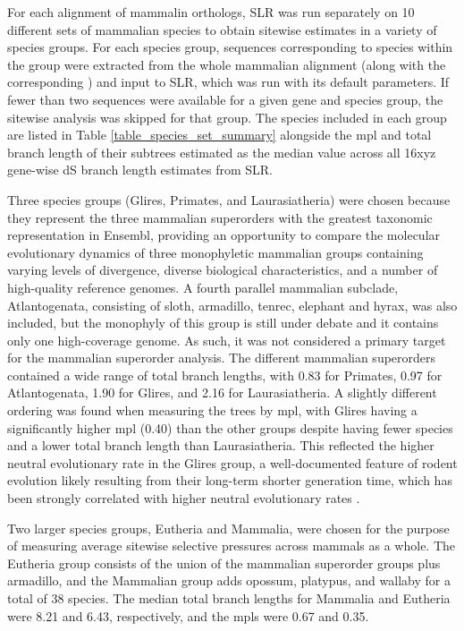 For each alignment of mammalin orthologs, SLR was run separately on 10
different sets of mammalian species to obtain sitewise estimates in a
variety of species groups. For each species group, sequences
corresponding to species within the group were extracted from the
whole mammalian alignment (along with the corresponding \subtr) and
input to SLR, which was run with its default parameters. If fewer than
two sequences were available for a given gene and species group, the
sitewise analysis was skipped for that group. The species included in
each group are listed in Table \ref{table_species_set_summary} alongside the
\ac{mpl} and total branch length of their subtrees estimated as the
median value across all 16xyz gene-wise dS branch length estimates
from SLR.

Three species groups (Glires, Primates, and Laurasiatheria) were
chosen because they represent the three mammalian superorders with the
greatest taxonomic representation in Ensembl, providing an opportunity
to compare the molecular evolutionary dynamics of three monophyletic
mammalian groups containing varying levels of divergence, diverse
biological characteristics, and a number of high-quality reference
genomes. A fourth parallel mammalian subclade, Atlantogenata,
consisting of sloth, armadillo, tenrec, elephant and hyrax, was also
included, but the monophyly of this group is still under debate
\citep{Murphy2007,Churakov2009} and it contains only one high-coverage
genome. As such, it was not considered a primary target for the
mammalian superorder analysis. The different mammalian superorders
contained a wide range of total branch lengths, with 0.83 for
Primates, 0.97 for Atlantogenata, 1.90 for Glires, and 2.16 for
Laurasiatheria. A slightly different ordering was found when measuring
the trees by \ac{mpl}, with Glires having a significantly higher
\ac{mpl} (0.40) than the other groups despite having fewer species and
a lower total branch length than Laurasiatheria. This reflected the
higher neutral evolutionary rate in the Glires group, a
well-documented feature of rodent evolution likely resulting from
their long-term shorter generation time, which has been strongly
correlated with higher neutral evolutionary rates
\citep{Nikolaev2007a,Smith2008}.

Two larger species groups, Eutheria and Mammalia, were chosen for the
purpose of measuring average sitewise selective pressures across
mammals as a whole. The Eutheria group consists of the union of the
mammalian superorder groups plus armadillo, and the Mammalian group
adds opossum, platypus, and wallaby for a total of 38 species. The
median total branch lengths for Mammalia and Eutheria were 8.21 and
6.43, respectively, and the \ac{mpl}s were 0.67 and 0.35.

